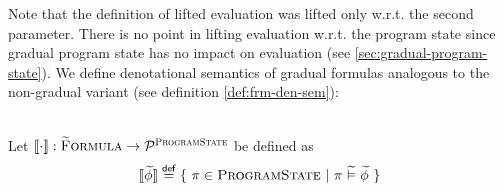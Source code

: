 Note that the definition of lifted evaluation was lifted only w.r.t. the second parameter.
There is no point in lifting evaluation w.r.t. the program state since gradual program state has no impact on evaluation (see \ref{sec:gradual-program-state}).
We define denotational semantics of gradual formulas analogous to the non-gradual variant (see definition \ref{def:frm-den-sem}):
\begin{definition}~\\
    \label{def:gfrm-den-sem}
    Let $\llbracket \cdot \rrbracket : \textup{\textsc{\ensuremath{\widetilde{\text{F}}}ormula}} \rightarrow \mathcal{P}^{\textup{\textsc{ProgramState}}}$ be defined as
    \begin{displaymath}
    \llbracket \widetilde{\phi} \rrbracket \overset{\textup{\textmd{\textsf{def}}}}{=} \{~ \pi \in \textup{\textsc{ProgramState}} ~|~ \pi \,\,\widetilde{\vDash}\,\, \widetilde{\phi} ~\}
    \end{displaymath}
\end{definition}


